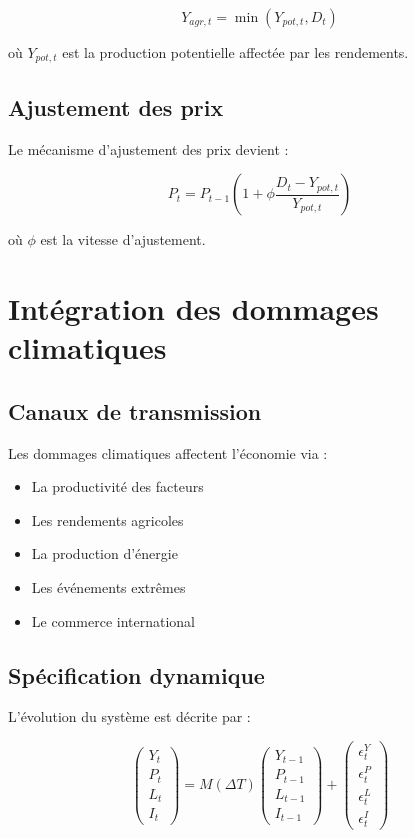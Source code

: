 \begin{equation}
Y_{agr,t} = \min(Y_{pot,t}, D_t)
\end{equation}

où $Y_{pot,t}$ est la production potentielle affectée par les rendements.

\subsection{Ajustement des prix}
Le mécanisme d'ajustement des prix devient :

\begin{equation}
P_t = P_{t-1}\left(1 + \phi\frac{D_t - Y_{pot,t}}{Y_{pot,t}}\right)
\end{equation}

où $\phi$ est la vitesse d'ajustement.

\section{Intégration des dommages climatiques}

\subsection{Canaux de transmission}
Les dommages climatiques affectent l'économie via :
\begin{itemize}
    \item La productivité des facteurs
    \item Les rendements agricoles
    \item La production d'énergie
    \item Les événements extrêmes
    \item Le commerce international
\end{itemize}

\subsection{Spécification dynamique}
L'évolution du système est décrite par :

\begin{equation}
\begin{pmatrix}
Y_t \\ P_t \\ L_t \\ I_t
\end{pmatrix} = 
M(\Delta T)\begin{pmatrix}
Y_{t-1} \\ P_{t-1} \\ L_{t-1} \\ I_{t-1}
\end{pmatrix} +
\begin{pmatrix}
\epsilon^Y_t \\ \epsilon^P_t \\ \epsilon^L_t \\ \epsilon^I_t
\end{pmatrix}
\end{equation}
